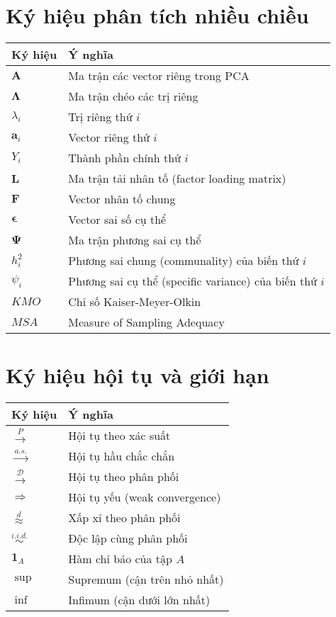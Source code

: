 \section*{Ký hiệu phân tích nhiều chiều}
\begin{longtable}{@{}p{3cm}p{10cm}@{}}
\textbf{Ký hiệu} & \textbf{Ý nghĩa} \\
\hline
\endhead
$\mathbf{A}$ & Ma trận các vector riêng trong PCA \\
$\boldsymbol{\Lambda}$ & Ma trận chéo các trị riêng \\
$\lambda_i$ & Trị riêng thứ $i$ \\
$\mathbf{a}_i$ & Vector riêng thứ $i$ \\
$Y_i$ & Thành phần chính thứ $i$ \\
$\mathbf{L}$ & Ma trận tải nhân tố (factor loading matrix) \\
$\mathbf{F}$ & Vector nhân tố chung \\
$\boldsymbol{\epsilon}$ & Vector sai số cụ thể \\
$\boldsymbol{\Psi}$ & Ma trận phương sai cụ thể \\
$h_i^2$ & Phương sai chung (communality) của biến thứ $i$ \\
$\psi_i$ & Phương sai cụ thể (specific variance) của biến thứ $i$ \\
$KMO$ & Chỉ số Kaiser-Meyer-Olkin \\
$MSA$ & Measure of Sampling Adequacy \\
\end{longtable}

\section*{Ký hiệu hội tụ và giới hạn}
\begin{longtable}{@{}p{3cm}p{10cm}@{}}
\textbf{Ký hiệu} & \textbf{Ý nghĩa} \\
\hline
\endhead
$\xrightarrow{P}$ & Hội tụ theo xác suất \\
$\xrightarrow{a.s.}$ & Hội tụ hầu chắc chắn \\
$\xrightarrow{\mathcal{D}}$ & Hội tụ theo phân phối \\
$\Rightarrow$ & Hội tụ yếu (weak convergence) \\
$\overset{d}{\approx}$ & Xấp xỉ theo phân phối \\
$\overset{i.i.d.}{\sim}$ & Độc lập cùng phân phối \\
$\mathbf{1}_A$ & Hàm chỉ báo của tập $A$ \\
$\sup$ & Supremum (cận trên nhỏ nhất) \\
$\inf$ & Infimum (cận dưới lớn nhất) \\
\end{longtable}

